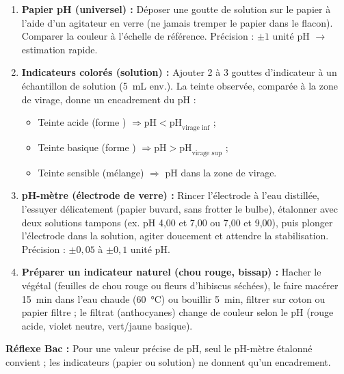 \documentclass[11pt]{article}
\newcommand{\cle}[1]{{\popxbold\color{popdark}#1}}
\begin{document}
\begin{methode}
\begin{enumerate}
\item \textbf{Papier pH (universel) :} Déposer une goutte de solution sur le papier à l'aide d'un agitateur en verre (ne jamais tremper le papier dans le flacon). Comparer la couleur à l'échelle de référence. Précision : $\pm 1$ unité pH $\rightarrow$ estimation rapide.
\item \textbf{Indicateurs colorés (solution) :} Ajouter 2 à 3 gouttes d'indicateur à un échantillon de solution (\SI{5}{mL} env.). La teinte observée, comparée à la \cle{zone de virage}, donne un encadrement du pH :
\begin{itemize}
\item Teinte acide (forme ) $\Rightarrow \mathrm{pH} < \mathrm{pH}_{\text{virage inf}}$ ;
\item Teinte basique (forme ) $\Rightarrow \mathrm{pH} > \mathrm{pH}_{\text{virage sup}}$ ;
\item Teinte sensible (mélange) $\Rightarrow$ pH dans la zone de virage.
\end{itemize}
\item \textbf{pH-mètre (électrode de verre) :} Rincer l'électrode à l'eau distillée, l'essuyer délicatement (papier buvard, sans frotter le bulbe), étalonner avec deux solutions tampons (ex. pH 4,00 et 7,00 ou 7,00 et 9,00), puis plonger l'électrode dans la solution, agiter doucement et attendre la stabilisation. Précision : $\pm 0{,}05$ à $\pm 0{,}1$ unité pH.
\item \textbf{Préparer un indicateur naturel (chou rouge, bissap) :} Hacher le végétal (feuilles de chou rouge ou fleurs d'hibiscus séchées), le faire macérer \SI{15}{min} dans l'eau chaude (\SI{60}{\celsius}) ou bouillir \SI{5}{min}, filtrer sur coton ou papier filtre ; le filtrat (anthocyanes) change de couleur selon le pH (rouge acide, violet neutre, vert/jaune basique).
\end{enumerate}
\textbf{Réflexe Bac :} Pour une valeur précise de pH, seul le \cle{pH-mètre} étalonné convient ; les indicateurs (papier ou solution) ne donnent qu'un encadrement.
\end{methode}
\end{document}
